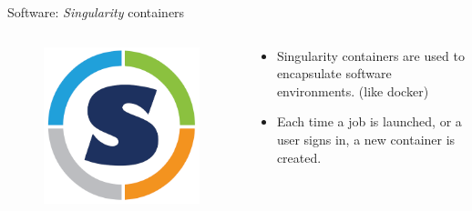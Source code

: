 \begin{frame}{Software: \textit{Singularity} containers}
    \begin{columns}
        \begin{column}{0.4\textwidth}
            \begin{figure}
                \centering
                \includegraphics[width=\textwidth]{images/singularity_logo.png}
            \end{figure}
        \end{column}
        \begin{column}{0.6\textwidth}
            \begin{itemize}
                \item Singularity containers are used to encapsulate software environments. (like docker)
                \item Each time a job is launched, or a user signs in, a new container is created.
            \end{itemize}
        \end{column}
    \end{columns}
\end{frame}

